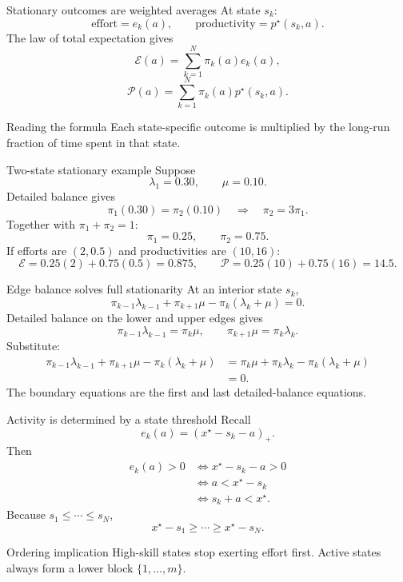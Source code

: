 \documentclass[aspectratio=169,10pt]{beamer}
\newcommand{\pos}[1]{\left(#1\right)_{+}}
\newcommand{\calP}{\mathcal{P}}
\newcommand{\calE}{\mathcal{E}}
\begin{document}
\begin{frame}{Stationary outcomes are weighted averages}
At state $s_k$:
\[
\text{effort}=e_k(a),
\qquad
\text{productivity}=p^\star(s_k,a).
\]
The law of total expectation gives
\[
\boxed{
\calE(a)=\sum_{k=1}^N\pi_k(a)e_k(a),}
\]
\[
\boxed{
\calP(a)=\sum_{k=1}^N
\pi_k(a)p^\star(s_k,a).}
\]
\begin{exampleblock}{Reading the formula}
Each state-specific outcome is multiplied by the long-run fraction of time spent in that state.
\end{exampleblock}
\end{frame}

\begin{frame}{Two-state stationary example}
Suppose
\[
\lambda_1=0.30,
\qquad
\mu=0.10.
\]
Detailed balance gives
\[
\pi_1(0.30)=\pi_2(0.10)
\quad\Longrightarrow\quad
\pi_2=3\pi_1.
\]
Together with $\pi_1+\pi_2=1$:
\[
\pi_1=0.25,\qquad\pi_2=0.75.
\]
If efforts are $(2,0.5)$ and productivities are $(10,16)$:
\[
\calE=0.25(2)+0.75(0.5)=0.875,
\qquad
\calP=0.25(10)+0.75(16)=14.5.
\]
\end{frame}

\begin{frame}{Edge balance solves full stationarity}
At an interior state $s_k$,
\[
\pi_{k-1}\lambda_{k-1}
+\pi_{k+1}\mu
-\pi_k(\lambda_k+\mu)=0.
\]
Detailed balance on the lower and upper edges gives
\[
\pi_{k-1}\lambda_{k-1}=\pi_k\mu,
\qquad
\pi_{k+1}\mu=\pi_k\lambda_k.
\]
Substitute:
\begin{align*}
\pi_{k-1}\lambda_{k-1}
+\pi_{k+1}\mu
-\pi_k(\lambda_k+\mu)
&=\pi_k\mu+\pi_k\lambda_k
-\pi_k(\lambda_k+\mu)\\
&=0.
\end{align*}
The boundary equations are the first and last detailed-balance equations.
\end{frame}

\begin{frame}{Activity is determined by a state threshold}
Recall
\[
e_k(a)=\pos{x^\star-s_k-a}.
\]
Then
\begin{align*}
e_k(a)>0
&\Longleftrightarrow x^\star-s_k-a>0\\
&\Longleftrightarrow a<x^\star-s_k\\
&\Longleftrightarrow s_k+a<x^\star.
\end{align*}
Because $s_1\le\cdots\le s_N$,
\[
x^\star-s_1\ge\cdots\ge x^\star-s_N.
\]
\begin{block}{Ordering implication}
High-skill states stop exerting effort first. Active states always form a lower block $\{1,\ldots,m\}$.
\end{block}
\end{frame}
\end{document}
